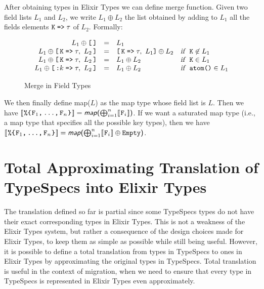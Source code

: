 \documentclass{article}
\begin{document}
After obtaining types in Elixir Types we can define merge function. Given two field lists $L_1$ and $L_2$, we write $L_1 \oplus L_2$ the list obtained by adding to $L_1$ all the fields elements $\texttt{K}\;\texttt{=>}\;\tau$ of $L_2$. Formally:
\begin{figure} [H]
   \[\begin{array}{rcll}
      L_1 \oplus \texttt{[\,]} &= & L_1 \\
      L_1 \oplus \texttt{[}\,\texttt{K}\;\texttt{=>}\;\tau,\,\,L_2\,\texttt{]} &=& \texttt{[}\,\texttt{K}\;\texttt{=>}\;\tau,\,\,L_1\texttt{]} \oplus L_2  & \textsl{if }\ \texttt{K}\not\in L_1 \\
      L_1 \oplus \texttt{[}\,\texttt{K}\;\texttt{=>}\;\tau,\,\,L_2\,\texttt{]} &=& L_1 \oplus L_2 & \textsl{if }\ \texttt{K}\in L_1 \\
      L_1 \oplus \texttt{[}\,\texttt{:}k\;\texttt{=>}\;\tau,\,\,L_2\,\texttt{]} &=& L_1 \oplus L_2 & \textsl{if }\ \texttt{atom()}\in L_1 \\
   \end{array}\]
   \caption{Merge in Field Types}
   \label{app:merge-in-field-types}
\end{figure}


We then finally define \textsf{map($L$)} as the map type whose field list is $L$. Then we have $[\![\hspace{.07em}\texttt{\%\{}\hspace{.07em}\mbox{\ensuremath{\texttt{\texttt{F}$_1$,\,...,\,\texttt{F}$_n$}}}\hspace{.07em}\texttt{\}}\hspace{.07em}]\!] =\textsf{\textsl{map}($\bigoplus_{i=1}^{n}[\![\hspace{.07em}\texttt{F}_i\hspace{.07em}]\!]$)}$. If we want a saturated map type (i.e., a map type that specifies all the possible key types), then we have $[\![\hspace{.07em}\texttt{\%\{}\hspace{.07em}\mbox{\ensuremath{\texttt{\texttt{F}$_1$,\,...,\,\texttt{F}$_n$}}}\hspace{.07em}\texttt{\}}\hspace{.07em}]\!] =\textsf{\textsl{map}($\bigoplus_{i=1}^{n}[\![\hspace{.07em}\texttt{F}_i\hspace{.07em}]\!]\oplus\texttt{Empty}$)}$.


\section{Total Approximating Translation of TypeSpecs into Elixir Types}

The translation defined so far is partial since some TypeSpecs types do not have their exact corresponding types in Elixir Types. 
This is not a weakness of the Elixir Types system, but rather a consequence of the design choices made for Elixir Types, to keep them as simple as possible while still being useful. 
However, it is possible to define a total translation from types in TypeSpecs to ones in Elixir Types by approximating the original types in TypeSpecs. 
Total translation is useful in the context of migration, when we need to ensure that every type in TypeSpecs is represented in Elixir Types even approximately.
\end{document}
